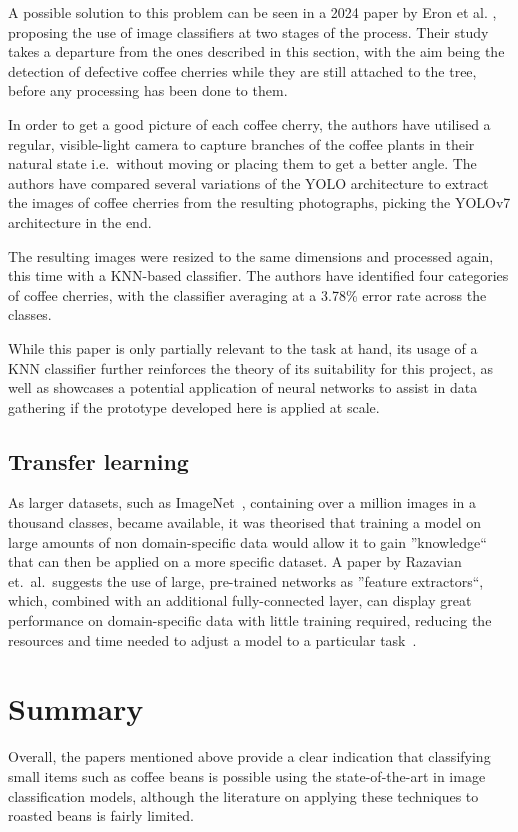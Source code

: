 A possible
solution to this problem can be seen in a 2024 paper by Eron et al.
\cite{eronCoffeeCherryOnTrees}, proposing the use of image classifiers at two stages
of the process.
Their study takes a departure from the ones described in this
section, with the aim being the detection of defective coffee cherries while they
are still attached to the tree, before any processing has been done to them.

In order to get a good picture of each coffee cherry, the authors have utilised a
regular, visible-light camera to capture branches of the coffee plants in their
natural state i.e.\ without moving or placing them to get a better angle.
The
authors have compared several variations of the YOLO architecture to extract the
images of coffee cherries from the resulting photographs, picking the YOLOv7 architecture
in the end.

The resulting images were resized to the same dimensions and processed again,
this time with a KNN-based classifier.
The authors have identified four categories
of coffee cherries, with the classifier averaging at a 3.78\% error rate across the
classes.

While this paper is only partially relevant to the task at hand, its usage of a
KNN classifier further reinforces the theory of its suitability for this project,
as well as showcases a potential application of neural networks to assist in data
gathering if the prototype developed here is applied at scale.

\subsection{Transfer learning}
\label{sec:transfer-learning-litreview}
As larger datasets, such as ImageNet~\cite{imageNet}, containing over a million images in a thousand classes,
became available, it was theorised that training a model on large amounts of non domain-specific data would allow it
to gain ''knowledge`` that can then be applied on a more specific dataset.
A paper by Razavian et.\ al.\ suggests the use of large, pre-trained networks as ''feature extractors``, which,
combined with an additional fully-connected layer, can display great performance on domain-specific data with little training
required, reducing the resources and time needed to adjust a model to a particular task~\cite{transferLearning}.

\section{Summary}
\label{sec:lit-review-summary}
Overall, the papers mentioned above provide a
clear indication that classifying small items such as coffee beans is possible
using the state-of-the-art in image classification models, although the literature on applying these techniques to roasted
beans is fairly limited.

